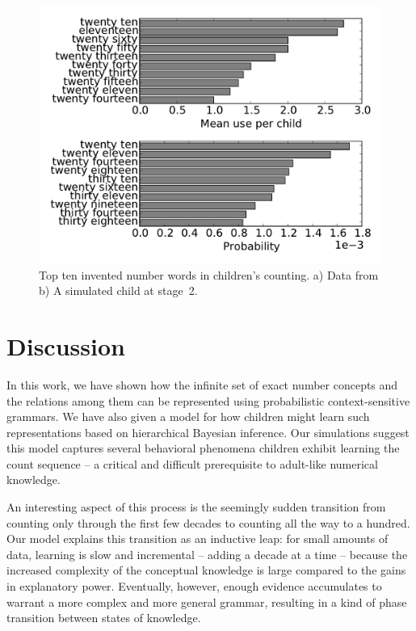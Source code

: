 \documentclass[10pt,letterpaper]{article}
\begin{document}


\begin{figure}[t]
\includegraphics[width=0.9\linewidth]{figures/inventedWordComparison}
\caption{Top ten invented number words in children's counting. a) Data
  from \citeauthor{FusRicBriar1982} b) A simulated child at stage~2.
   \label{fig:inventedWordComparison}}
\end{figure}


\section{Discussion}

In this work, we have shown how the infinite set of exact number
concepts and the relations among them can be represented using
probabilistic context-sensitive grammars. We have also given a model
for how children might learn such representations based on
hierarchical Bayesian inference. Our simulations suggest this model
captures several behavioral phenomena children exhibit learning the count
sequence -- a critical and difficult prerequisite to adult-like
numerical knowledge.

An interesting aspect of this process is the seemingly sudden
transition from counting only through the first few decades to
counting all the way to a hundred. Our model explains this transition
as an inductive leap: for small amounts of data, learning is slow and
incremental -- adding a decade at a time -- because the increased
complexity of the conceptual knowledge is large compared to the gains
in explanatory power. Eventually, however, enough evidence accumulates
to warrant a more complex and more general grammar, resulting
in a kind of phase transition between states of knowledge.
\end{document}

